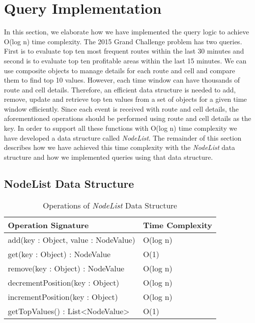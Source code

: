 \section{Query Implementation}
In this section, we elaborate how we have implemented the query logic to achieve O(log n) time complexity. The 2015 Grand Challenge problem has two queries. First is to evaluate top ten most frequent routes within the last 30 minutes and second is to evaluate top ten profitable areas within the last 15 minutes. We can use composite objects to manage details for each route and cell and compare them to find top 10 values. However, each time window can have thousands of route and cell details. Therefore, an efficient data structure is needed to add, remove, update and retrieve top ten values from a set of objects for a given time window efficiently. Since each event is received with route and cell details, the aforementioned operations should be performed using route and cell details as the key. In order to support all these functions with O(log n) time complexity we have developed a data structure called \textit{NodeList}. The remainder of this section describes how we have achieved this time complexity with the \textit{NodeList} data structure and how we implemented queries using that data structure.

\subsection{NodeList Data Structure}

\begin{table}
\centering
\caption{Operations of \textit{NodeList} Data Structure}
\begin{tabular}{|l|l|} \hline
Operation Signature & Time Complexity \\ \hline \hline
add(key : Object, value : NodeValue) & O(log n) \\ \hline 
get(key : Object) : NodeValue & O(1) \\ \hline
remove(key : Object) : NodeValue & O(log n) \\ \hline
decrementPosition(key : Object) & O(log n) \\ \hline
incrementPosition(key : Object) & O(log n) \\ \hline
getTopValues() : List<NodeValue> & O(1) \\ \hline
\end{tabular}
\label{nodelist_api}
\end{table}


